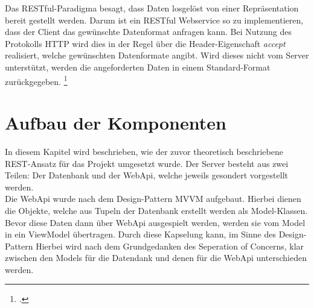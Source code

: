 Das RESTful-Paradigma besagt, dass Daten losgelöst von einer Repräsentation bereit gestellt werden. Darum ist ein RESTful Webservice so zu implementieren, dass der Client das gewünschte Datenformat anfragen kann. Bei Nutzung des Protokolls HTTP wird dies in der Regel über die Header-Eigenschaft \textit{accept} realisiert, welche gewünschten Datenformate angibt. Wird dieses nicht vom Server unterstützt, werden die angeforderten Daten in einem Standard-Format zurückgegeben. \footcite[S. 26ff.]{REST-und-HTTP}
\section{Aufbau der Komponenten}
\label{sec:aufbau-Komponenten}
In diesem Kapitel wird beschrieben, wie der zuvor theoretisch beschriebene REST-Ansatz für das Projekt umgesetzt wurde. Der Server besteht aus zwei Teilen: Der Datenbank und der WebApi, welche jeweils gesondert vorgestellt werden.\\
Die WebApi wurde nach dem Design-Pattern \ac{MVVM} aufgebaut. Hierbei dienen die Objekte, welche aus Tupeln der Datenbank erstellt werden als Model-Klassen. Bevor diese Daten dann über WebApi ausgespielt werden, werden sie vom Model in ein ViewModel übertragen. Durch diese Kapselung kann, im Sinne des Design-Pattern Hierbei wird nach dem Grundgedanken des \ac{Seperation of Concerns}, klar zwischen den Models für die Datendank und denen für die WebApi unterschieden werden. 
